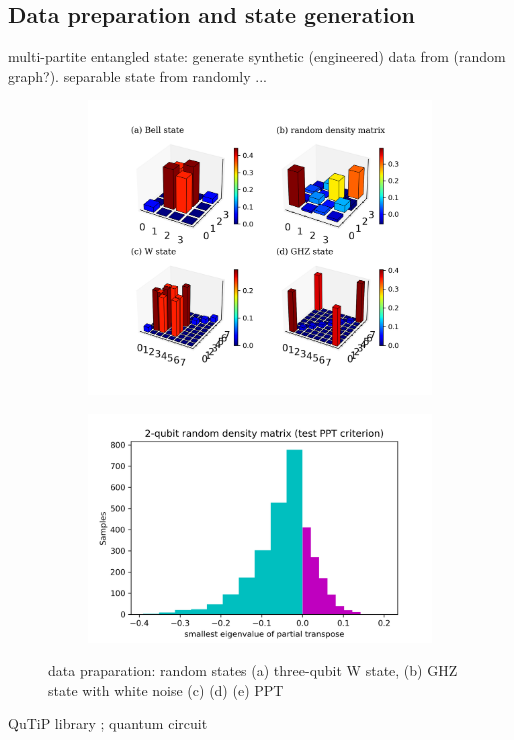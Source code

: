 \documentclass[
aps,
pra,
floatfix,
]{revtex4-2}
\theoremstyle{plain}
\theoremstyle{definition}
\begin{document}
\subsection{Data preparation and state generation}
multi-partite entangled state: generate synthetic (engineered) data from (random graph?).
separable state from randomly ...
\begin{figure}[!ht]
	\centering
	\begin{subfigure}{0.42\textwidth}
	\centering
		\includegraphics[width=.9\linewidth]{./Code/dataset_sample.png}
	\end{subfigure}
	\begin{subfigure}{0.55\textwidth}
	\centering
		\includegraphics[width=.9\linewidth]{./Code/two_qubit_PPT_hist.png}
	\end{subfigure}
	\caption{data praparation: random states (a) three-qubit W state, (b) GHZ state with white noise (c) (d) (e) PPT}
\end{figure}
QuTiP library \cite{johanssonQuTiPPythonFramework2013}; quantum circuit \cite{liPulselevelNoisyQuantum2022}
\end{document}
